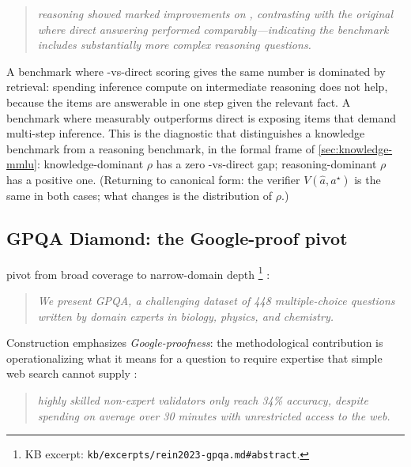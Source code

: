 \begin{quote}\itshape
{} reasoning showed marked improvements on ,
contrasting with the original  where direct answering performed
comparably---indicating the benchmark includes substantially more
complex reasoning questions.
\end{quote}

\begin{intuition}
A benchmark where -vs-direct scoring gives the same number is
dominated by retrieval: spending inference compute on intermediate
reasoning does not help, because the items are answerable in one
step given the relevant fact. A benchmark where  measurably
outperforms direct is exposing items that demand multi-step
inference. This is the diagnostic that distinguishes a knowledge
benchmark from a reasoning benchmark, in the formal frame of
\cref{sec:knowledge-mmlu}: knowledge-dominant $\rho$ has a
zero -vs-direct gap; reasoning-dominant $\rho$ has a positive
one. (Returning to canonical form: the verifier
$V(\hat{a}, a^\star)$ is the same in both cases; what changes is
the distribution of $\rho$.)
\end{intuition}

\subsection{GPQA Diamond: the Google-proof pivot}
\label{sec:knowledge-gpqa}

\citet{rein2023-gpqa} pivot from broad coverage to narrow-domain depth%
\footnote{KB excerpt: \texttt{kb/excerpts/rein2023-gpqa.md\#abstract}.}
\citep[\S{}abstract]{rein2023-gpqa}:

\begin{quote}\itshape
We present GPQA, a challenging dataset of 448 multiple-choice questions
written by domain experts in biology, physics, and chemistry.
\end{quote}

Construction emphasizes \emph{Google-proofness}: the methodological
contribution is operationalizing what it means for a question to
require expertise that simple web search cannot supply
\citep[\S{}abstract]{rein2023-gpqa}:

\begin{quote}\itshape
highly skilled non-expert validators only reach 34\% accuracy, despite
spending on average over 30 minutes with unrestricted access to the web.
\end{quote}

